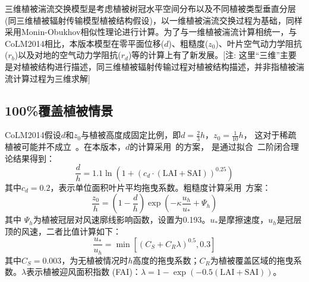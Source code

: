 三维植被湍流交换模型是考虑植被树冠水平空间分布以及不同植被类型垂直分层(同三维植被辐射传输模型植被结构假设)，以一维植被湍流交换过程为基础，同样采用Monin-Obukhov相似性理论进行计算。为了与一维植被湍流计算相统一，与CoLM2014相比，本版本模型在零平面位移($d$)、粗糙度($z_0$)、叶片空气动力学阻抗($r_b$)以及对地的空气动力学阻抗($r_d$)等的计算上有了新发展。[注: 这里“三维”主要是对植被结构进行描述，同三维植被辐射传输过程对植被结构描述，并非指植被湍流计算过程为三维求解]


\subsection{100\%覆盖植被情景}\label{百分百植被覆盖湍流}
CoLM2014假设$d$和$z_0$与植被高度成固定比例，即$d=\frac{2}{3}h$，$z_0=\frac{1}{10}h$，
这对于稀疏植被可能并不成立~\citep{zeng2007consistent}。在本版本，$d$的计算采用~\citet{choudhury1988}的方案，
是通过拟合~\citet{shaw1982aerodynamic}二阶闭合理论结果得到：
\begin{equation}\label{dOh}
\frac{d}{h}=1.1 \ln \left(1+\left(c_{d} \cdot (\text {LAI} + \text {SAI})\right)^{0.25}\right)
\end{equation}
其中$c_d=0.2$，表示单位面积叶片平均拖曳系数。粗糙度计算采用~\citet{raupach1992drag,raupach1994simplified}方案：
\begin{equation}\label{zOh}
\frac{z_{0}}{h}=\left(1-\frac{d}{h}\right) \exp \left(-\kappa \frac{u_{h}}{u_{*}}+\Psi_{h}\right)
\end{equation}
其中%
$\Psi_h$为植被冠层对风速廓线影响函数，设置为0.193。$u_\ast$是摩擦速度，$u_h$是冠层顶的风速，二者比值计算如下：
\begin{equation}\label{ustrarOuh}
\frac{u_{*}}{u_{h}}=\min \left[\left(C_{S}+C_{R} \lambda\right)^{0.5}, 0.3\right]
\end{equation}
其中$C_S=0.003$，为无植被情况时$h$高度的拖曳系数；$C_R$为植被覆盖区域的拖曳系数。$\lambda$表示植被迎风面积指数 (FAI)：$\lambda=1-\exp{\left(-0.5 (\text {LAI}+\text {SAI})\right)}$。


